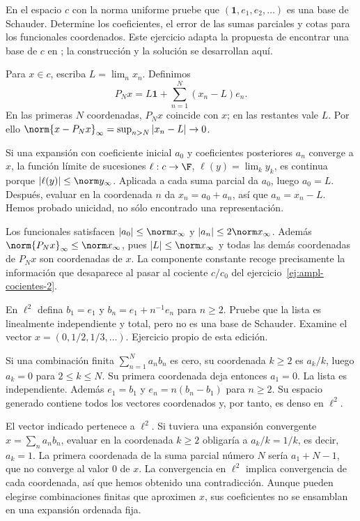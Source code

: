 \begin{ejercicio}\label{ej:ampl-schauder-1}
En el espacio $c$ con la norma uniforme pruebe que $(\mathbf1,e_1,e_2,\ldots)$ es una base de Schauder. Determine los coeficientes, el error de las sumas parciales y cotas para los funcionales coordenados. Este ejercicio adapta la propuesta de encontrar una base de $c$ en \cite{max-schauder}; la construcción y la solución se desarrollan aquí.
\end{ejercicio}
\begin{solucion}
Para $x\in c$, escriba $L=\lim_nx_n$. Definimos
\[
 P_Nx=L\mathbf1+\sum_{n=1}^N(x_n-L)e_n.
\]
En las primeras $N$ coordenadas, $P_Nx$ coincide con $x$; en las restantes vale $L$. Por ello
$\norm{x-P_Nx}_\infty=\sup_{n>N}|x_n-L|\to0$.

Si una expansión con coeficiente inicial $a_0$ y coeficientes posteriores $a_n$ converge a $x$, la función límite de sucesiones $\ell:c\to\F$, $\ell(y)=\lim_ky_k$, es continua porque $|\ell(y)|\le\norm y_\infty$. Aplicada a cada suma parcial da $a_0$, luego $a_0=L$. Después, evaluar en la coordenada $n$ da $x_n=a_0+a_n$, así que $a_n=x_n-L$. Hemos probado unicidad, no sólo encontrado una representación.

Los funcionales satisfacen $|a_0|\le\norm x_\infty$ y $|a_n|\le2\norm x_\infty$. Además $\norm{P_Nx}_\infty\le\norm x_\infty$, pues $|L|\le\norm x_\infty$ y todas las demás coordenadas de $P_Nx$ son coordenadas de $x$. La componente constante recoge precisamente la información que desaparece al pasar al cociente $c/c_0$ del ejercicio~\ref{ej:ampl-cocientes-2}.
\end{solucion}

\begin{ejercicio}\label{ej:ampl-schauder-2}
En $\ell^2$ defina $b_1=e_1$ y $b_n=e_1+n^{-1}e_n$ para $n\ge2$. Pruebe que la lista es linealmente independiente y total, pero no es una base de Schauder. Examine el vector $x=(0,1/2,1/3,\ldots)$. Ejercicio propio de esta edición.
\end{ejercicio}
\begin{solucion}
Si una combinación finita $\sum_{n=1}^Na_nb_n$ es cero, su coordenada $k\ge2$ es $a_k/k$, luego $a_k=0$ para $2\le k\le N$. Su primera coordenada deja entonces $a_1=0$. La lista es independiente. Además $e_1=b_1$ y $e_n=n(b_n-b_1)$ para $n\ge2$. Su espacio generado contiene todos los vectores coordenados y, por tanto, es denso en $\ell^2$.

El vector indicado pertenece a $\ell^2$. Si tuviera una expansión convergente $x=\sum_na_nb_n$, evaluar en la coordenada $k\ge2$ obligaría a $a_k/k=1/k$, es decir, $a_k=1$. La primera coordenada de la suma parcial número $N$ sería $a_1+N-1$, que no converge al valor $0$ de $x$. La convergencia en $\ell^2$ implica convergencia de cada coordenada, así que hemos obtenido una contradicción. Aunque pueden elegirse combinaciones finitas que aproximen $x$, sus coeficientes no se ensamblan en una expansión ordenada fija.
\end{solucion}


